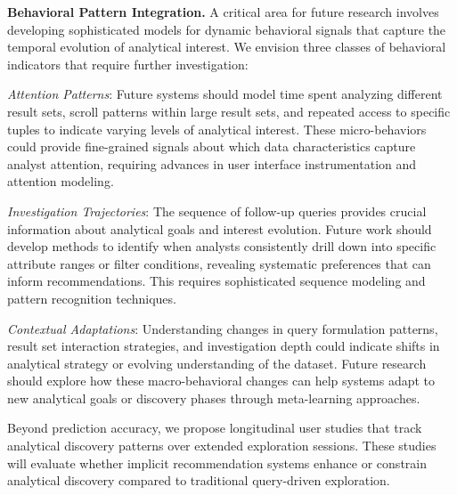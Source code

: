 \documentclass[sigconf, nonacm]{acmart}
\begin{document}
\textbf{Behavioral Pattern Integration.} A critical area for future research involves developing sophisticated models for dynamic behavioral signals that capture the temporal evolution of analytical interest. We envision three classes of behavioral indicators that require further investigation:

\textit{Attention Patterns}: Future systems should model time spent analyzing different result sets, scroll patterns within large result sets, and repeated access to specific tuples to indicate varying levels of analytical interest. These micro-behaviors could provide fine-grained signals about which data characteristics capture analyst attention, requiring advances in user interface instrumentation and attention modeling.

\textit{Investigation Trajectories}: The sequence of follow-up queries provides crucial information about analytical goals and interest evolution. Future work should develop methods to identify when analysts consistently drill down into specific attribute ranges or filter conditions, revealing systematic preferences that can inform recommendations. This requires sophisticated sequence modeling and pattern recognition techniques.

\textit{Contextual Adaptations}: Understanding changes in query formulation patterns, result set interaction strategies, and investigation depth could indicate shifts in analytical strategy or evolving understanding of the dataset. Future research should explore how these macro-behavioral changes can help systems adapt to new analytical goals or discovery phases through meta-learning approaches.

Beyond prediction accuracy, we propose longitudinal user studies that track analytical discovery patterns over extended exploration sessions. These studies will evaluate whether implicit recommendation systems enhance or constrain analytical discovery compared to traditional query-driven exploration. 

\begin{acks}
\end{acks}




\end{document}
